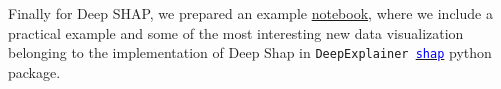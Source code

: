 Finally for Deep SHAP, we prepared an example \textcolor{blue}{\href{https://colab.research.google.com/drive/1mkUgZO_04Tv5ojWPF8hSb6VROcfpbfTE?usp=sharing} {notebook}}, where we include a practical example and some of the most interesting new data visualization belonging to the implementation of Deep Shap in \texttt{DeepExplainer \href{https://github.com/slundberg/shap}{\textcolor{blue}{shap}}} python package.

